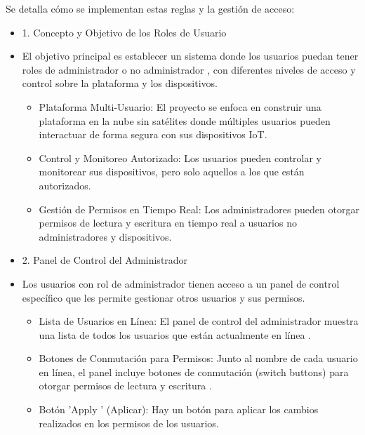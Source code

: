 \documentclass{report}
\begin{document}
Se detalla cómo se implementan estas reglas y la gestión de acceso:
\begin{itemize}
    \item 1. Concepto y Objetivo de los Roles de Usuario
    \item El objetivo principal es establecer un sistema donde los  usuarios puedan tener roles de administrador o no administrador , con diferentes 
    niveles de acceso y control sobre la plataforma y los dispositivos.
    \begin{itemize}
        \item Plataforma Multi-Usuario: El proyecto se enfoca en construir una plataforma en la nube sin satélites donde múltiples usuarios pueden 
        interactuar de forma segura con sus dispositivos IoT.
        \item Control y Monitoreo Autorizado: Los usuarios pueden controlar y monitorear sus dispositivos, pero solo aquellos a los que están 
        autorizados.
        \item Gestión de Permisos en Tiempo Real: Los administradores pueden otorgar permisos de lectura y escritura en tiempo real a usuarios 
        no administradores y dispositivos.
    \end{itemize}

    \item 2. Panel de Control del Administrador
    \item Los usuarios con rol de administrador tienen acceso a un panel de control específico que les permite gestionar otros usuarios y sus permisos.
    \begin{itemize}
        \item Lista de Usuarios en Línea: El panel de control del administrador muestra una  lista de todos los usuarios que están actualmente en línea .
        \item Botones de Conmutación para Permisos: Junto al nombre de cada usuario en línea, el panel incluye  botones de conmutación (switch buttons) 
        para otorgar permisos de lectura y escritura .
        \item Botón  'Apply ' (Aplicar): Hay un botón para aplicar los cambios realizados en los permisos de los usuarios.
    \end{itemize}


\end{itemize}
\end{document}
